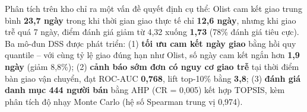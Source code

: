 \documentclass[a4paper]{article}
\begin{document}
Phân tích trên kho chỉ ra một vấn đề quyết định cụ thể: Olist cam kết giao trung bình \textbf{23,7 ngày} trong khi thời gian giao thực tế chỉ \textbf{12,6 ngày}, nhưng khi giao trễ quá 7 ngày, điểm đánh giá giảm từ 4,32 xuống \textbf{1,73} (78\% đánh giá tiêu cực). Ba mô-đun DSS được phát triển: (1) \textbf{tối ưu cam kết ngày giao} bằng hồi quy quantile -- với cùng tỷ lệ giao đúng hạn như Olist, số ngày cam kết ngắn hơn \textbf{1,9 ngày} (giảm 8,8\%); (2) \textbf{cảnh báo sớm đơn có nguy cơ giao trễ} tại thời điểm bàn giao vận chuyển, đạt ROC-AUC \textbf{0,768}, lift top-10\% bằng \textbf{3,8}; (3) \textbf{đánh giá danh mục 444 người bán} bằng AHP (CR = 0,005) kết hợp TOPSIS, kèm phân tích độ nhạy Monte Carlo (hệ số Spearman trung vị 0,974).

\newpage
\tableofcontents
\newpage
\listoffigures
\listoftables
\newpage

\end{document}
